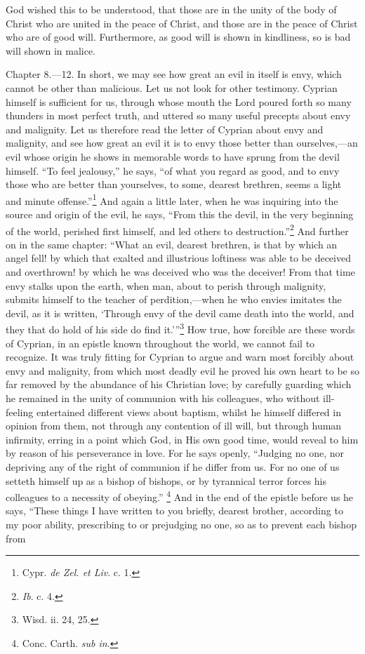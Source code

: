 God wished this to be understood, that those are in the unity of the body of Christ who are united in the peace of Christ, and those are in the peace of Christ who are of good will. Furthermore, as good will is shown in kindliness, so is bad will shown in malice.


Chapter 8.—12. In short, we may see how great an evil in itself is envy, which cannot be other than malicious. Let us not look for other testimony. Cyprian himself is sufficient for us, through whose mouth the Lord poured forth so many thunders in most perfect truth, and uttered so many useful precepts about envy and malignity. Let us therefore read the letter of Cyprian about envy and malignity, and see how great an evil it is to envy those better than ourselves,—an evil whose origin he shows in memorable words to have sprung from the devil himself. ``To feel jealousy,'' he says, ``of what you regard as good, and to envy those who are better than yourselves, to some, dearest brethren, seems a light and minute offense.''\footnote{\par  Cypr. \emph{de Zel. et Liv}. c. 1.} And again a little later, when he was inquiring into the source and origin of the evil, he says, ``From this the devil, in the very beginning of the world, perished first himself, and led others to destruction.''\footnote{\par  \emph{Ib}. c. 4.} And further on in the same chapter: ``What an evil, dearest brethren, is that by which an angel fell! by which that exalted and illustrious loftiness was able to be deceived and overthrown! by which he was deceived who was the deceiver! From that time envy stalks upon the earth, when man, about to perish through malignity, submits himself to the teacher of perdition,—when he who envies imitates the devil, as it is written, ‘Through envy of the devil came death into the world, and they that do hold of his side do find it.’''\footnote{\par  Wisd. ii. 24, 25.} How true, how forcible are these words of Cyprian, in an epistle known throughout the world, we cannot fail to recognize. It was truly fitting for Cyprian to argue and warn most forcibly about envy and malignity, from which most deadly evil he proved his own heart to be so far removed by the abundance of his Christian love; by carefully guarding which he remained in the unity of communion with his colleagues, who without ill-feeling entertained different views about baptism, whilst he himself differed in opinion from them, not through any contention of ill will, but through human infirmity, erring in a point which God, in His own good time, would reveal to him by reason of his perseverance in love. For he says openly, ``Judging no one, nor depriving any of the right of communion if he differ from us. For no one of us setteth himself up as a bishop of bishops, or by tyrannical terror forces his colleagues to a necessity of obeying.'' \footnote{\par  Conc. Carth. \emph{sub in}.} And in the end of the epistle before us he says, ``These things I have written to you briefly, dearest brother, according to my poor ability, prescribing to or prejudging no one, so as to prevent each bishop from 